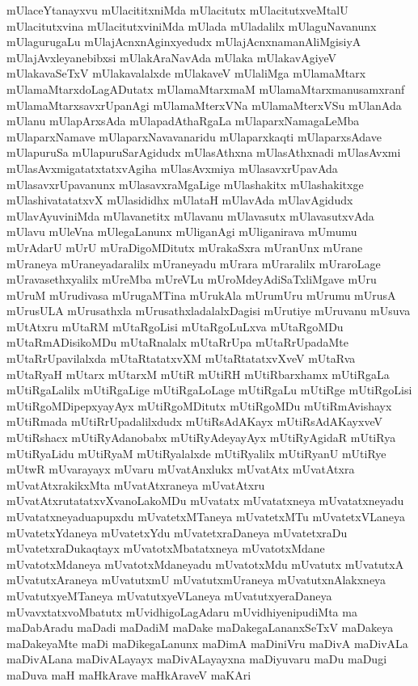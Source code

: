 {mUlaceYtanayxvu
mUlacititxniMda
mUlacitutx
mUlacitutxveMtalU
mUlacitutxvina
mUlacitutxviniMda
mUlada
mUladalilx
mUlaguNavanunx
mUlagurugaLu
mUlajAcnxnAginxyedudx
mUlajAcnxnamanAliMgisiyA
mUlajAvxleyanebibxsi
mUlakAraNavAda
mUlaka
mUlakavAgiyeV
mUlakavaSeTxV
mUlakavalalxde
mUlakaveV
mUlaliMga
mUlamaMtarx
mUlamaMtarxdoLagADutatx
mUlamaMtarxmaM
mUlamaMtarxmanusamxranf
mUlamaMtarxsavxrUpanAgi
mUlamaMterxVNa
mUlamaMterxVSu
mUlanAda
mUlanu
mUlapArxsAda
mUlapadAthaRgaLa
mUlaparxNamagaLeMba
mUlaparxNamave
mUlaparxNavavanaridu
mUlaparxkaqti
mUlaparxsAdave
mUlapuruSa
mUlapuruSarAgidudx
mUlasAthxna
mUlasAthxnadi
mUlasAvxmi
mUlasAvxmigatatxtatxvAgiha
mUlasAvxmiya
mUlasavxrUpavAda
mUlasavxrUpavanunx
mUlasavxraMgaLige
mUlashakitx
mUlashakitxge
mUlashivatatatxvX
mUlasididhx
mUlataH
mUlavAda
mUlavAgidudx
mUlavAyuviniMda
mUlavanetitx
mUlavanu
mUlavasutx
mUlavasutxvAda
mUlavu
mUleVna
mUlegaLanunx
mUliganAgi
mUliganirava
mUmumu
mUrAdarU
mUrU
mUraDigoMDitutx
mUrakaSxra
mUranUnx
mUrane
mUraneya
mUraneyadaralilx
mUraneyadu
mUrara
mUraralilx
mUraroLage
mUravasethxyalilx
mUreMba
mUreVLu
mUroMdeyAdiSaTxliMgave
mUru
mUruM
mUrudivasa
mUrugaMTina
mUrukAla
mUrumUru
mUrumu
mUrusA
mUrusULA
mUrusathxla
mUrusathxladalalxDagisi
mUrutiye
mUruvanu
mUsuva
mUtAtxru
mUtaRM
mUtaRgoLisi
mUtaRgoLuLxva
mUtaRgoMDu
mUtaRmADisikoMDu
mUtaRnalalx
mUtaRrUpa
mUtaRrUpadaMte
mUtaRrUpavilalxda
mUtaRtatatxvXM
mUtaRtatatxvXveV
mUtaRva
mUtaRyaH
mUtarx
mUtarxM
mUtiR
mUtiRH
mUtiRbarxhamx
mUtiRgaLa
mUtiRgaLalilx
mUtiRgaLige
mUtiRgaLoLage
mUtiRgaLu
mUtiRge
mUtiRgoLisi
mUtiRgoMDipepxyayAyx
mUtiRgoMDitutx
mUtiRgoMDu
mUtiRmAvishayx
mUtiRmada
mUtiRrUpadalilxdudx
mUtiRsAdAKayx
mUtiRsAdAKayxveV
mUtiRshacx
mUtiRyAdanobabx
mUtiRyAdeyayAyx
mUtiRyAgidaR
mUtiRya
mUtiRyaLidu
mUtiRyaM
mUtiRyalalxde
mUtiRyalilx
mUtiRyanU
mUtiRye
mUtwR
mUvarayayx
mUvaru
mUvatAnxlukx
mUvatAtx
mUvatAtxra
mUvatAtxrakikxMta
mUvatAtxraneya
mUvatAtxru
mUvatAtxrutatatxvXvanoLakoMDu
mUvatatx
mUvatatxneya
mUvatatxneyadu
mUvatatxneyaduapupxdu
mUvatetxMTaneya
mUvatetxMTu
mUvatetxVLaneya
mUvatetxYdaneya
mUvatetxYdu
mUvatetxraDaneya
mUvatetxraDu
mUvatetxraDukaqtayx
mUvatotxMbatatxneya
mUvatotxMdane
mUvatotxMdaneya
mUvatotxMdaneyadu
mUvatotxMdu
mUvatutx
mUvatutxA
mUvatutxAraneya
mUvatutxmU
mUvatutxmUraneya
mUvatutxnAlakxneya
mUvatutxyeMTaneya
mUvatutxyeVLaneya
mUvatutxyeraDaneya
mUvavxtatxvoMbatutx
mUvidhigoLagAdaru
mUvidhiyenipudiMta
ma
maDabAradu
maDadi
maDadiM
maDake
maDakegaLananxSeTxV
maDakeya
maDakeyaMte
maDi
maDikegaLanunx
maDimA
maDiniVru
maDivA
maDivALa
maDivALana
maDivALayayx
maDivALayayxna
maDiyuvaru
maDu
maDugi
maDuva
maH
maHkArave
maHkAraveV
maKAri
}
